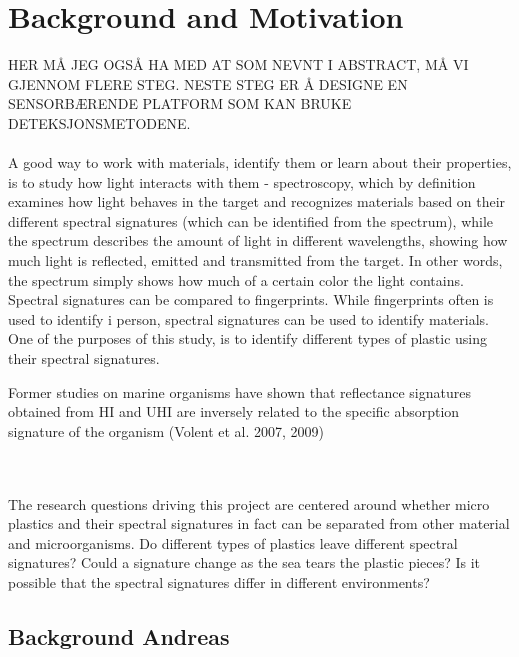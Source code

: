 \section{Background and Motivation}
HER MÅ JEG OGSÅ HA MED AT SOM NEVNT I ABSTRACT, MÅ VI GJENNOM FLERE STEG. NESTE STEG ER Å DESIGNE EN SENSORBÆRENDE PLATFORM SOM KAN BRUKE DETEKSJONSMETODENE. 
\\\\
A good way to work with materials, identify them or learn about their properties, is to study how light interacts with them - spectroscopy, which by definition examines how light behaves in the target and recognizes materials based on their different spectral signatures (which can be identified from the spectrum), while the spectrum describes the amount of light in different wavelengths, showing how much light is reflected, emitted and transmitted from the target. In other words, the spectrum simply shows how much of a certain color the light contains. 
Spectral signatures can be compared to fingerprints. While fingerprints often is used to identify i person, spectral signatures can be used to identify materials. One of the purposes of this study, is to identify different types of plastic using their spectral signatures. 

Former studies on marine organisms have shown that reflectance signatures obtained from HI and UHI are inversely related to the specific absorption signature of the organism (Volent et al. 2007, 2009)

\\\\
The research questions driving this project are centered around whether micro plastics and their spectral signatures in fact can be separated from other material and microorganisms. Do different types of plastics leave different spectral signatures? Could a signature change as the sea tears the plastic pieces? Is it possible that the spectral signatures differ in different environments?

\subsection{Background Andreas}

